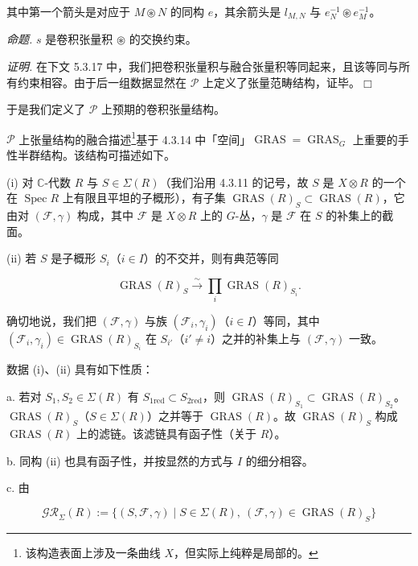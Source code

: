 其中第一个箭头是对应于 $M\circledast N$ 的同构 $e$，其余箭头是 $l_{M,N}$ 与 $e_N^{-1}\circledast e_M^{-1}$。

 \emph{命题.} $s$ 是卷积张量积 $\circledast$ 的交换约束。

\emph{证明.} 在下文 5.3.17 中，我们把卷积张量积与融合张量积等同起来，且该等同与所有约束相容。由于后一组数据显然在 $\mathcal{P}$ 上定义了张量范畴结构，证毕。\hfill$\Box$

于是我们定义了 $\mathcal{P}$ 上预期的卷积张量结构。

 $\mathcal{P}$ 上张量结构的融合描述\footnote{该构造表面上涉及一条曲线 $X$，但实际上纯粹是局部的。}基于 4.3.14 中「空间」$\operatorname{GRAS}=\operatorname{GRAS}_G$ 上重要的手性半群结构。该结构可描述如下。


(i) 对 $\mathbb{C}$-代数 $R$ 与 $S\in\Sigma(R)$（我们沿用 4.3.11 的记号，故 $S$ 是 $X\otimes R$ 的一个在 $\operatorname{Spec}R$ 上有限且平坦的子概形），有子集 $\operatorname{GRAS}(R)_S\subset\operatorname{GRAS}(R)$，它由对 $(\mathcal{F},\gamma)$ 构成，其中 $\mathcal{F}$ 是 $X\otimes R$ 上的 $G$-丛，$\gamma$ 是 $\mathcal{F}$ 在 $S$ 的补集上的截面。

(ii) 若 $S$ 是子概形 $S_i$（$i\in I$）的不交并，则有典范等同

\begin{equation}\tag{262}
\operatorname{GRAS}(R)_S\xrightarrow{\sim}\prod_i\operatorname{GRAS}(R)_{S_i}.
\end{equation}

确切地说，我们把 $(\mathcal{F},\gamma)$ 与族 $(\mathcal{F}_i,\gamma_i)$（$i\in I$）等同，其中 $(\mathcal{F}_i,\gamma_i)\in\operatorname{GRAS}(R)_{S_i}$ 在 $S_{i'}$（$i'\neq i$）之并的补集上与 $(\mathcal{F},\gamma)$ 一致。

数据 (i)、(ii) 具有如下性质：

a. 若对 $S_1,S_2\in\Sigma(R)$ 有 $S_{1\mathrm{red}}\subset S_{2\mathrm{red}}$，则 $\operatorname{GRAS}(R)_{S_1}\subset\operatorname{GRAS}(R)_{S_2}$。$\operatorname{GRAS}(R)_S$（$S\in\Sigma(R)$）之并等于 $\operatorname{GRAS}(R)$。故 $\operatorname{GRAS}(R)_S$ 构成 $\operatorname{GRAS}(R)$ 上的滤链。该滤链具有函子性（关于 $R$）。

b. 同构 (ii) 也具有函子性，并按显然的方式与 $I$ 的细分相容。

c. 由

\[
\mathcal{GR}_\Sigma(R):=\{(S,\mathcal{F},\gamma)\mid S\in\Sigma(R),\ (\mathcal{F},\gamma)\in\operatorname{GRAS}(R)_S\}
\]

